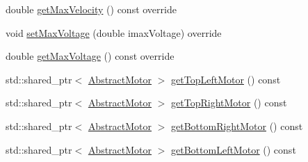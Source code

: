 \begin{DoxyCompactItemize}
\item 
double \mbox{\hyperlink{classokapi_1_1XDriveModel_aa5b5c3431c99c612ade5c97858478828}{get\+Max\+Velocity}} () const override
\item 
void \mbox{\hyperlink{classokapi_1_1XDriveModel_a6d001a2147ecb642f60cd21ac73c64ea}{set\+Max\+Voltage}} (double imax\+Voltage) override
\item 
double \mbox{\hyperlink{classokapi_1_1XDriveModel_a402487e35a717c47cfcc85ad1cfb0861}{get\+Max\+Voltage}} () const override
\item 
std\+::shared\+\_\+ptr$<$ \mbox{\hyperlink{classokapi_1_1AbstractMotor}{Abstract\+Motor}} $>$ \mbox{\hyperlink{classokapi_1_1XDriveModel_a6ffd50946ef2655b3d8c74c0d211101b}{get\+Top\+Left\+Motor}} () const
\item 
std\+::shared\+\_\+ptr$<$ \mbox{\hyperlink{classokapi_1_1AbstractMotor}{Abstract\+Motor}} $>$ \mbox{\hyperlink{classokapi_1_1XDriveModel_abd08edca41aa963c15fafc4b735c0e8d}{get\+Top\+Right\+Motor}} () const
\item 
std\+::shared\+\_\+ptr$<$ \mbox{\hyperlink{classokapi_1_1AbstractMotor}{Abstract\+Motor}} $>$ \mbox{\hyperlink{classokapi_1_1XDriveModel_aa7305b4d70feaf3d7201c4b60f29b289}{get\+Bottom\+Right\+Motor}} () const
\item 
std\+::shared\+\_\+ptr$<$ \mbox{\hyperlink{classokapi_1_1AbstractMotor}{Abstract\+Motor}} $>$ \mbox{\hyperlink{classokapi_1_1XDriveModel_a9d009ced4cfce5d1ba9ac2c4ad67212a}{get\+Bottom\+Left\+Motor}} () const
\end{DoxyCompactItemize}
